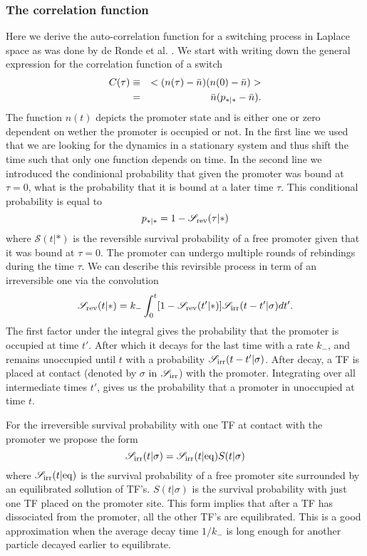 \subsubsection{The correlation function}
Here we derive the auto-correlation function for a switching process in Laplace space as was done by de Ronde et al. \cite{DeRonde2012}. We start with writing down the general expression for the correlation function of a switch
\begin{eqnarray}
 C(\tau) & \equiv & < (n(\tau) - \bar{n})(n(0) - \bar{n}) > \\
  	& = & \bar{n}(p_{*|*}-\bar{n}).
 \elabel{corr_func}
\end{eqnarray}
The function $n(t)$ depicts the promoter state and is either one or zero dependent on wether the promoter is occupied or not. In the first line we used that we are looking for the dynamics in a stationary system and thus shift the time such that only one function depends on time. In the second line we introduced the condinional probability that given the promoter was bound at $\tau=0$, what is the probability that it is bound at a later time $\tau$. This conditional probability is equal to
\begin{equation}
 p_{*|*} = 1 - \mathscr{S}_{\rm rev}(\tau|*)
\end{equation}
where $\mathscr{S}(t|*)$ is the reversible survival probability of a free promoter given that it was bound at $\tau=0$. The promoter can undergo multiple rounds of rebindings during the time $\tau$. We can describe this revirsible process in term of an irreversible one via the convolution \cite{Agmon1990}
\begin{equation}
 \mathscr{S}_{\rm rev}(t|*) = k_- \int_0^t [1-\mathscr{S}_{\rm rev}(t'|*)]\mathscr{S}_{\rm irr}(t-t'|\sigma)dt'.
 \elabel{rev_conv}
\end{equation}
The first factor under the integral gives the probability that the promoter is occupied at time $t'$. After which it decays for the last time with a rate $k_-$, and remains unoccupied until $t$ with a probability $\mathscr{S}_{\rm irr}(t-t'|\sigma)$. After decay, a TF is placed at contact (denoted by $\sigma$ in $\mathscr{S}_{\rm irr}$) with the promoter. Integrating over all intermediate times $t'$, gives us the probability that a promoter in unoccupied at time $t$. 

For the irreversible survival probability with one TF at contact with the promoter we propose the form
\begin{equation}
 \mathscr{S}_{\rm irr}(t|\sigma) = \mathscr{S}_{\rm irr}(t|{\rm eq}) S(t|\sigma)
\end{equation}
where $\mathscr{S}_{\rm irr}(t|{\rm eq})$ is the survival probability of a free promoter site surrounded by an equilibrated sollution of TF's. $S(t|\sigma)$ is the survival probability with just one TF placed on the promoter site. This form implies that after a TF has dissociated from the promoter, all the other TF's are equilibrated. This is a good approximation when the average decay time $1/k_-$ is long enough for another particle decayed earlier to equilibrate. 

